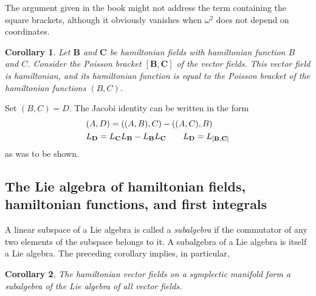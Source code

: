 \documentclass[leqno]{report}
\numberwithin{equation}{section}
\theoremstyle{plain}
\newtheorem{cor}{Corollary}
\let\oldendproof\endproof
\renewenvironment{proof}[1][\proofname]{%
  \oldproof[\textsc{#1}]%
}{\oldendproof}
\theoremstyle{definition}
\theoremstyle{remark}
\theoremstyle{smallcap}
\numberwithin{prob}{section}
\begin{document}
\begin{proof}[Proof of the Jacobi identity]
{    The argument given in the book might not address the term
    containing the square brackets,
    although it obviously vanishes when $\omega^2$ does not depend on
    coordinates.
  }
\end{proof}

\begin{cor}
  Let $\mathbf B$ and $\mathbf C$ be hamiltonian fields
  with hamiltonian function $B$ and $C$.
  Consider the Poisson bracket $[\mathbf B, \mathbf C]$
  of the vector fields.
  This vector field is hamiltonian,
  and its hamiltonian function is equal to the Poisson bracket
  of the hamiltonian functions $(B, C)$.
\end{cor}

\begin{proof}
  Set $(B, C) = D$.
  The Jacobi identity can be written in the form
  \begin{align}
    &(A, D) = ((A, B), C) - ((A, C), B)
    \label{eq:jacobi_D} \\
    &L_\mathbf{D} = L_\mathbf{C} L_\mathbf{B} - L_\mathbf{B} L_\mathbf{C}
    \qquad L_\mathbf{D} = L_{[\mathbf B, \mathbf C]}
    \notag
  \end{align}
  as was to be shown.

\end{proof}


\subsection{The Lie algebra of hamiltonian fields,
hamiltonian functions, and first integrals}

A linear subspace of a Lie algebra is called a \emph{subalgebra}
if the commutator of any two elements of the subspace
belongs to it.
%
A subalgebra of a Lie algebra is itself a Lie algebra.
%
The preceding corollary implies, in particular,

\begin{cor}
  The hamiltonian vector fields on a symplectic manifold
  form a subalgebra of the Lie algebra of all vector fields.
\end{cor}
\end{document}
